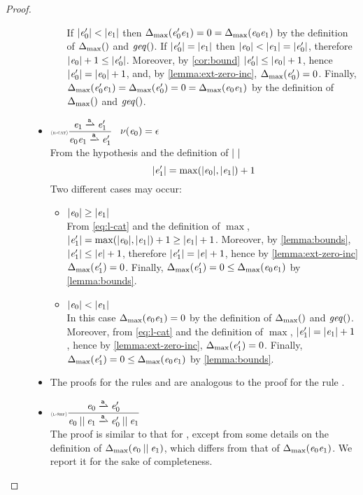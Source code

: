 \begin{proof}
\begin{description}
\begin{itemize}
\begin{itemize}
                 If ${\mid}{\mathit {e}_0'}{\mid}<{\mid}{\mathit {e}_1}{\mid}$ then ${\Delta_{\max}}({\mathit {e}_0'\mathit {e}_1})=0={\Delta_{\max}}({\mathit {e}_0\mathit {e}_1})$ by the definition of ${\Delta_{\max}}({})$ and $\mathit{geq}()$. If ${\mid}{\mathit {e}_0'}{\mid}={\mid}{\mathit {e}_1}{\mid}$ then ${\mid}{\mathit {e}_0}{\mid}<{\mid}{\mathit {e}_1}{\mid}={\mid}{\mathit {e}_0'}{\mid}$, therefore ${\mid}{\mathit {e}_0}{\mid}+1\leq{\mid}{\ensuremath{\mathit {e}}_0'}{\mid}$. Moreover, by \cref{cor:bound} ${\mid}{\mathit {e}'_0}{\mid}\leq{\mid}{\ensuremath{\mathit {e}}_0}{\mid}+1$, hence ${\mid}{\mathit {e}_0'}{\mid}={\mid}{\mathit {e}_0}{\mid}+1$, and, by \cref{lemma:ext-zero-inc}, ${\Delta_{\max}}({\mathit {e}_0'})=0$. Finally,
                 ${\Delta_{\max}}({\mathit {e}_0'\mathit {e}_1})={\Delta_{\max}}({\mathit {e}_0'})=0={\Delta_{\max}}({\mathit {e}_0\mathit {e}_1})$ by the definition of ${\Delta_{\max}}({})$ and $\mathit{geq}()$.
          \end{itemize}

    \item $\Rule{r-cat}{\re_1\parDer{\sym}\re'_1}{\re_0\catop\re_1\parDer{\sym}\re'_1}{\hasEps{\re_0}=\eps}$\\[2ex]
          From the hypothesis and the definition of ${\mid}{\ }{\mid}$
          \begin{equation}
           \label{eq:l-cat}
           {\mid}{\ensuremath{\mathit {e}}_1'}{\mid}=\max({\mid}{\mathit {e}_0}{\mid},{\mid}{\mathit {e}_1}{\mid})+1
          \end{equation}
          Two different cases may occur:
          \begin{itemize}
           \item ${\mid}{\mathit {e}_0}{\mid}\geq{\mid}{\ensuremath{\mathit {e}}_1}{\mid}$\\
                 From \cref{eq:l-cat} and the definition of $\max$, ${\mid}{\mathit {e}_1'}{\mid}=\max({\mid}{\mathit {e}_0}{\mid},{\mid}{\mathit {e}_1}{\mid})+1\geq{\mid}{\ensuremath{\mathit {e}}_1}{\mid}+1$. Moreover, by \cref{lemma:bounds},
                 ${\mid}{\mathit {e}_1'}{\mid}\leq{\mid}{\ensuremath{\mathit {e}}}{\mid}+1$, therefore ${\mid}{\mathit {e}_1'}{\mid}={\mid}{\mathit {e}}{\mid}+1$, hence by \cref{lemma:ext-zero-inc} ${\Delta_{\max}}({\mathit {e}_1'})=0$.
                 Finally, ${\Delta_{\max}}({\mathit {e}_1'})=0\leq{\Delta_{\max}}({\mathit {e}_0\mathit {e}_1})$ by \cref{lemma:bounds}.

           \item ${\mid}{\mathit {e}_0}{\mid}<{\mid}{\mathit {e}_1}{\mid}$\\
                 In this case ${\Delta_{\max}}({\mathit {e}_0\mathit {e}_1})=0$ by the definition of ${\Delta_{\max}}({})$ and $\mathit{geq}()$. Moreover, from \cref{eq:l-cat} and the definition of $\max$, ${\mid}{\mathit {e}_1'}{\mid}={\mid}{\mathit {e}_1}{\mid}+1$, hence  by \cref{lemma:ext-zero-inc}, ${\Delta_{\max}}({\mathit {e}_1'})=0$. Finally,
                 ${\Delta_{\max}}({\mathit {e}_1'})=0\leq{\Delta_{\max}}({\mathit {e}_0\mathit {e}_1})$ by \cref{lemma:bounds}.
          \end{itemize}

    \item The proofs for the rules  and  are analogous to the proof for the rule .
    \item $\Rule{l-shf}{\re_0\parDer{\sym}\re'_0}{\re_0\shuffleop\re_1\parDer{\sym}\re'_0\shuffleop\re_1}{}$\\[2ex]
          The proof is similar to that for , except from some details on the definition of ${\Delta_{\max}}({\mathit {e}_0\mathbin{||}\mathit {e}_1})$, which differs from that of ${\Delta_{\max}}({\mathit {e}_0\mathit {e}_1})$. We report it for the sake of completeness.


\end{itemize}
\end{description}
\end{proof}
